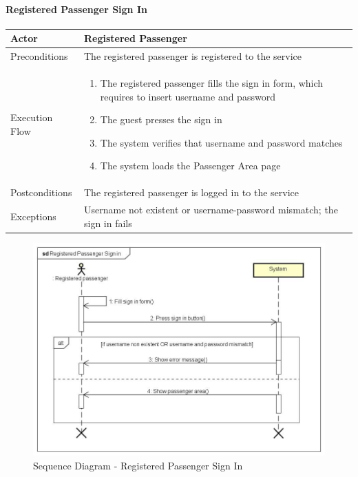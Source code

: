 		\paragraph{Registered Passenger Sign In}
			\begin{center}
				\begin{tabular}{ | l | p{8cm} |}
					\hline
					Actor &  Registered Passenger	\\ \hline
					Preconditions & The registered passenger is registered to the service	\\ \hline
					Execution Flow & \begin{enumerate}
						\item The registered passenger fills the sign in form, which requires to insert username and password
						\item The guest presses the sign in
						\item The system verifies that username and password matches
						\item The system loads the Passenger Area page
					\end{enumerate}		\\ \hline
					Postconditions & The registered passenger is logged in to the service	\\ \hline
					Exceptions & Username not existent or username-password mismatch; the sign in fails \\ \hline
				\end{tabular}
			\end{center}
			\begin{figure}[!h]
				\begin{center}			
				\includegraphics[scale=0.5]{../SE2_SD/RegisteredPassengerSignIn}
				\caption{Sequence Diagram - Registered Passenger Sign In}	
				\end{center}
			\end{figure}
